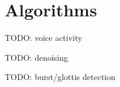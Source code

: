 \section{Algorithms}
\begin{itemize*}
	\item TODO: voice activity
	\item TODO: denoising
	\item TODO: burst/glottis detection
\end{itemize*}




